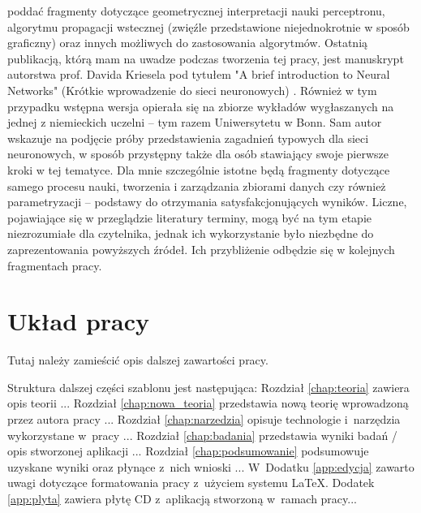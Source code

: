 poddać fragmenty dotyczące geometrycznej interpretacji nauki perceptronu, algorytmu propagacji wstecznej (zwięźle przedstawione niejednokrotnie w sposób graficzny) oraz innych możliwych do zastosowania algorytmów. Ostatnią publikacją, którą mam na uwadze podczas tworzenia tej pracy, jest manuskrypt autorstwa prof. Davida Kriesela pod tytułem "A brief introduction to Neural Networks" (Krótkie wprowadzenie do sieci neuronowych) \cite{Kri07}. Również w tym przypadku wstępna wersja opierała się na zbiorze wykładów wygłaszanych na jednej z niemieckich uczelni -- tym razem Uniwersytetu w Bonn. Sam autor wskazuje na podjęcie próby przedstawienia zagadnień typowych dla sieci neuronowych, w sposób przystępny także dla osób stawiający swoje pierwsze kroki w tej tematyce. Dla mnie szczególnie istotne będą fragmenty dotyczące samego procesu nauki, tworzenia i zarządzania zbiorami danych czy również parametryzacji -- podstawy do otrzymania satysfakcjonujących wyników. Liczne, pojawiające się w przeglądzie literatury terminy, mogą być na tym etapie niezrozumiałe dla czytelnika, jednak ich wykorzystanie było niezbędne do zaprezentowania powyższych źródeł. Ich przybliżenie odbędzie się w kolejnych fragmentach pracy.

\iffalse
\section{Układ pracy}


{\color{red} Tutaj należy zamieścić opis dalszej zawartości pracy.}

Struktura dalszej części szablonu jest następująca: Rozdział \ref{chap:teoria} zawiera opis teorii ... Rozdział \ref{chap:nowa_teoria} przedstawia nową teorię wprowadzoną przez autora pracy ... Rozdział \ref{chap:narzedzia} opisuje technologie i~narzędzia wykorzystane w~pracy ...  Rozdział \ref{chap:badania} przedstawia wyniki badań / opis stworzonej aplikacji ... Rozdział \ref{chap:podsumowanie} podsumowuje uzyskane wyniki oraz płynące z~nich wnioski ... W~Dodatku \ref{app:edycja} zawarto uwagi dotyczące formatowania pracy z~użyciem systemu \LaTeX. Dodatek \ref{app:plyta} zawiera płytę CD z~aplikacją stworzoną w~ramach pracy...

